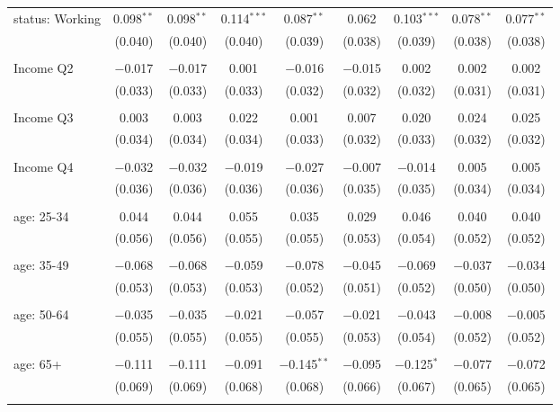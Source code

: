 \begin{tabular}{@{\extracolsep{5pt}}lcccccccc}
 status: Working & 0.098$^{**}$ & 0.098$^{**}$ & 0.114$^{***}$ & 0.087$^{**}$ & 0.062 & 0.103$^{***}$ & 0.078$^{**}$ & 0.077$^{**}$ \\ 
  & (0.040) & (0.040) & (0.040) & (0.039) & (0.038) & (0.039) & (0.038) & (0.038) \\ 
  & & & & & & & & \\ 
 Income Q2 & $-$0.017 & $-$0.017 & 0.001 & $-$0.016 & $-$0.015 & 0.002 & 0.002 & 0.002 \\ 
  & (0.033) & (0.033) & (0.033) & (0.032) & (0.032) & (0.032) & (0.031) & (0.031) \\ 
  & & & & & & & & \\ 
 Income Q3 & 0.003 & 0.003 & 0.022 & 0.001 & 0.007 & 0.020 & 0.024 & 0.025 \\ 
  & (0.034) & (0.034) & (0.034) & (0.033) & (0.032) & (0.033) & (0.032) & (0.032) \\ 
  & & & & & & & & \\ 
 Income Q4 & $-$0.032 & $-$0.032 & $-$0.019 & $-$0.027 & $-$0.007 & $-$0.014 & 0.005 & 0.005 \\ 
  & (0.036) & (0.036) & (0.036) & (0.036) & (0.035) & (0.035) & (0.034) & (0.034) \\ 
  & & & & & & & & \\ 
 age: 25-34 & 0.044 & 0.044 & 0.055 & 0.035 & 0.029 & 0.046 & 0.040 & 0.040 \\ 
  & (0.056) & (0.056) & (0.055) & (0.055) & (0.053) & (0.054) & (0.052) & (0.052) \\ 
  & & & & & & & & \\ 
 age: 35-49 & $-$0.068 & $-$0.068 & $-$0.059 & $-$0.078 & $-$0.045 & $-$0.069 & $-$0.037 & $-$0.034 \\ 
  & (0.053) & (0.053) & (0.053) & (0.052) & (0.051) & (0.052) & (0.050) & (0.050) \\ 
  & & & & & & & & \\ 
 age: 50-64 & $-$0.035 & $-$0.035 & $-$0.021 & $-$0.057 & $-$0.021 & $-$0.043 & $-$0.008 & $-$0.005 \\ 
  & (0.055) & (0.055) & (0.055) & (0.055) & (0.053) & (0.054) & (0.052) & (0.052) \\ 
  & & & & & & & & \\ 
 age: 65+ & $-$0.111 & $-$0.111 & $-$0.091 & $-$0.145$^{**}$ & $-$0.095 & $-$0.125$^{*}$ & $-$0.077 & $-$0.072 \\ 
  & (0.069) & (0.069) & (0.068) & (0.068) & (0.066) & (0.067) & (0.065) & (0.065) \\ 
  & & & & & & & & \\ 

\end{tabular}
